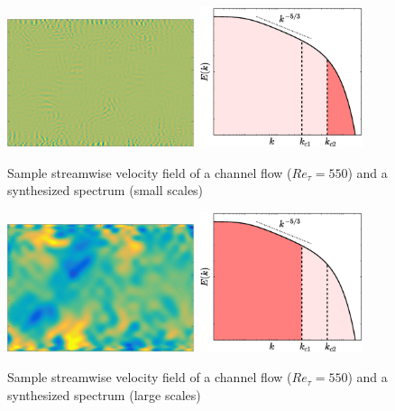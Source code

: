 \documentclass{beamer}
\begin{document}
\begin{frame}
\begin{overprint}
\begin{figure}
	\end{figure}
	\begin{figure}
		\includegraphics[height=3.75cm,valign=t]{./figures/turbulence/Usmall.png}
		\includegraphics[height=4.1cm,valign=t]{./figures/turbulence/turbulence_spectra_variousranges3.eps}
		\caption*{Sample streamwise velocity field of a channel flow ($ Re_\tau = 550$) and a synthesized spectrum (small scales)}
	\end{figure}
	\begin{figure}
		\includegraphics[height=3.75cm,valign=t]{./figures/turbulence/Ularge.png}
		\includegraphics[height=4.1cm,valign=t]{./figures/turbulence/turbulence_spectra_variousranges1.eps}
		\caption*{Sample streamwise velocity field of a channel flow ($ Re_\tau = 550$) and a synthesized spectrum (large scales)}
	\end{figure}
	\begin{figure}

\end{figure}
\end{overprint}
\end{frame}
\end{document}
